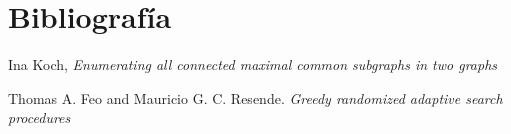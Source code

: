
\section{Bibliografía}

\begingroup
\renewcommand{\section}[2]{}%

\begin{thebibliography}{}

 Ina Koch, {\em Enumerating all connected maximal common subgraphs in
two graphs}

 Thomas A. Feo and Mauricio G. C. Resende. {\em Greedy randomized adaptive search procedures}

\end{thebibliography}